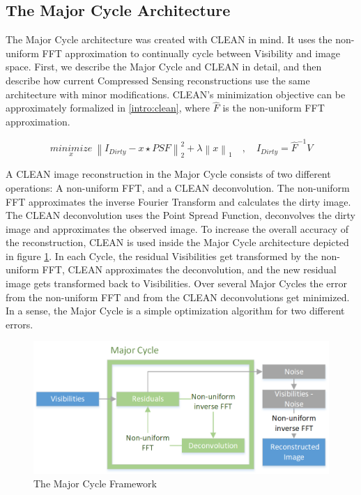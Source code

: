 \subsection{The Major Cycle Architecture}
The Major Cycle architecture was created with CLEAN in mind. It uses the non-uniform FFT approximation to continually cycle between Visibility and image space. First, we describe the Major Cycle and CLEAN in detail, and then describe how current Compressed Sensing reconstructions use the same architecture with minor modifications. CLEAN's minimization objective can be approximately formalized in \eqref{intro:clean}, where $\hat{F}$ is the non-uniform FFT approximation.

\begin{equation}\label{intro:clean}
\underset{x}{minimize} \: \left \|  I_{Dirty} - x \star PSF \right \|_2^2 + \lambda \left \| x \right \|_1 \quad, \quad I_{Dirty} = \hat{F}^{-1} V
\end{equation}

A CLEAN image reconstruction in the Major Cycle consists of two different operations: A non-uniform FFT, and a CLEAN deconvolution. The non-uniform FFT approximates the inverse Fourier Transform and calculates the dirty image. The CLEAN deconvolution uses the Point Spread Function, deconvolves the dirty image and approximates the observed image. To increase the overall accuracy of the reconstruction, CLEAN is used inside the Major Cycle architecture depicted in figure \ref{intro:major}. In each Cycle, the residual Visibilities get transformed by the non-uniform FFT, CLEAN approximates the deconvolution, and the new residual image gets transformed back to Visibilities. Over several Major Cycles the error from the non-uniform FFT and from the CLEAN deconvolutions get minimized. In a sense, the Major Cycle is a simple optimization algorithm for two different errors.

\begin{figure}
	\centering
	\includegraphics[width=0.80\linewidth]{./chapters/01.intro/Major-Minor.png}
	\caption{The Major Cycle Framework}
	\label{intro:major}
\end{figure}


